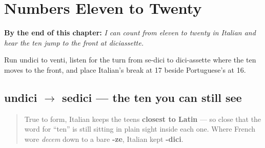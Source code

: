 
\chapter{Numbers Eleven to Twenty}
\label{ch:it-numbers-eleven-to-twenty}

\begin{chapteropening}
\textbf{By the end of this chapter:} \emph{I can count from eleven to twenty in Italian and hear the ten jump to the front at diciassette.}

Run undici to venti, listen for the turn from se-dici to dici-assette where the ten moves to the front, and place Italian's break at 17 beside Portuguese's at 16.
\end{chapteropening}

\section[undici — sedici]{undici $\to$ sedici — the ten you can still see}

\label{lesson:IT-C12-numeri-11-16}



\begin{quote}
True to form, Italian keeps the teens \textbf{closest to Latin} — so close that the word for \textquotedblleft{}ten\textquotedblright{} is still sitting in plain sight inside each one. Where French wore \emph{decem} down to a bare \textbf{-ze}, Italian kept \textbf{-dici}.
\end{quote}

